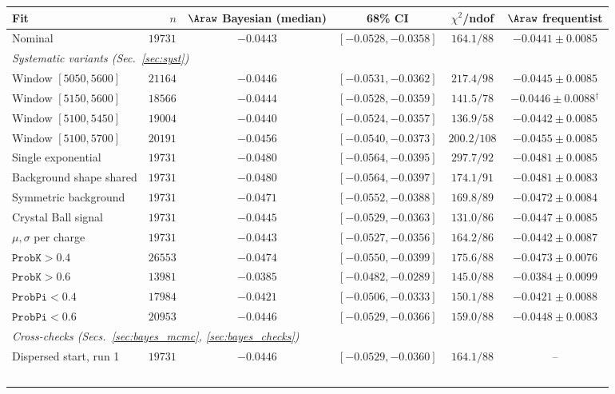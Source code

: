 \begin{table}[t]
\centering
\begin{tabular}{lrccc|c}
\toprule
Fit & $n$ & $\Araw$ Bayesian (median) & 68\% CI & $\chi^2$/ndof & $\Araw$ frequentist \\
\midrule
Nominal & $19731$ & $-0.0443$ & $[-0.0528,-0.0358]$ & $164.1/88$ & $-0.0441\pm0.0085$ \\
\multicolumn{6}{l}{\emph{Systematic variants (Sec.~\ref{sec:syst})}} \\
Window $[5050,5600]$ & $21164$ & $-0.0446$ & $[-0.0531,-0.0362]$ & $217.4/98$ & $-0.0445\pm0.0085$ \\
Window $[5150,5600]$ & $18566$ & $-0.0444$ & $[-0.0528,-0.0359]$ & $141.5/78$ & $-0.0446\pm0.0088$$^\dagger$ \\
Window $[5100,5450]$ & $19004$ & $-0.0440$ & $[-0.0524,-0.0357]$ & $136.9/58$ & $-0.0442\pm0.0085$ \\
Window $[5100,5700]$ & $20191$ & $-0.0456$ & $[-0.0540,-0.0373]$ & $200.2/108$ & $-0.0455\pm0.0085$ \\
Single exponential & $19731$ & $-0.0480$ & $[-0.0564,-0.0395]$ & $297.7/92$ & $-0.0481\pm0.0085$ \\
Background shape shared & $19731$ & $-0.0480$ & $[-0.0564,-0.0397]$ & $174.1/91$ & $-0.0481\pm0.0083$ \\
Symmetric background & $19731$ & $-0.0471$ & $[-0.0552,-0.0388]$ & $169.8/89$ & $-0.0472\pm0.0084$ \\
Crystal Ball signal & $19731$ & $-0.0445$ & $[-0.0529,-0.0363]$ & $131.0/86$ & $-0.0447\pm0.0085$ \\
$\mu,\sigma$ per charge & $19731$ & $-0.0443$ & $[-0.0527,-0.0356]$ & $164.2/86$ & $-0.0442\pm0.0087$ \\
$\texttt{ProbK}>0.4$ & $26553$ & $-0.0474$ & $[-0.0550,-0.0399]$ & $175.6/88$ & $-0.0473\pm0.0076$ \\
$\texttt{ProbK}>0.6$ & $13981$ & $-0.0385$ & $[-0.0482,-0.0289]$ & $145.0/88$ & $-0.0384\pm0.0099$ \\
$\texttt{ProbPi}<0.4$ & $17984$ & $-0.0421$ & $[-0.0506,-0.0333]$ & $150.1/88$ & $-0.0421\pm0.0088$ \\
$\texttt{ProbPi}<0.6$ & $20953$ & $-0.0446$ & $[-0.0529,-0.0366]$ & $159.0/88$ & $-0.0448\pm0.0083$ \\
\multicolumn{6}{l}{\emph{Cross-checks (Secs.~\ref{sec:bayes_mcmc}, \ref{sec:bayes_checks})}} \\
Dispersed start, run 1 & $19731$ & $-0.0446$ & $[-0.0529,-0.0360]$ & $164.1/88$ & -- \\
$$
\end{tabular}
\end{table}
